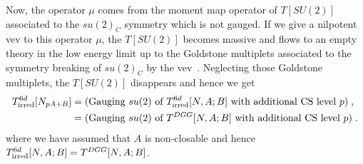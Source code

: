 \documentclass[a4paper,11pt]{article}
\begin{document}
Now, the operator $\mu$ comes from the moment map operator of $T[SU(2)]$ associated to the $su(2)_C$ symmetry which is not gauged.
If we give a nilpotent vev to this operator $\mu$, the $T[SU(2)]$ becomes massive and flows to an empty theory in the low energy limit up to the 
Goldstone multiplets associated to the symmetry breaking of $su(2)_C$ by the vev~\cite{Gaiotto:2008ak}.
Neglecting those Goldstone multiplets, the $T[SU(2)]$ disappears and hence we get
%
\begin{align}
\begin{split}
T^{6d}_{\rm irred}[N_{pA+B}] &= (\textrm{Gauging $su(2)$ of $T^{6d}_{\rm irred}[N,A;B]$ with additional CS level $p$})\;, 
\\
&= (\textrm{Gauging $su(2)$ of $T^{DGG}[N,A;B]$ with additional CS level $p$})\;.
\label{integral Dehn filling = gauging}
\end{split}
\end{align}
%
where we have assumed that $A$ is non-closable and hence $T^{6d}_{\rm irred}[N,A;B] = T^{DGG}[N,A;B]$.
\end{document}
